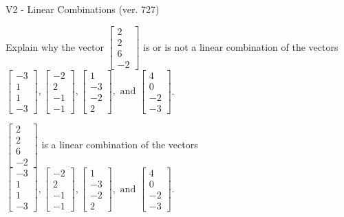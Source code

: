 \begin{exercise}
  \begin{exerciseTitle}V2 - Linear Combinations (ver. 727)\end{exerciseTitle}
  \begin{exerciseStatement}
    Explain why the vector \(\left[\begin{array}{c}
2 \\
2 \\
6 \\
-2
\end{array}\right]\)  is or is not a linear 
	combination of the vectors \(\left[\begin{array}{c}
-3 \\
1 \\
1 \\
-3
\end{array}\right] , \left[\begin{array}{c}
-2 \\
2 \\
-1 \\
-1
\end{array}\right] , \left[\begin{array}{c}
1 \\
-3 \\
-2 \\
2
\end{array}\right] , \text{ and } \left[\begin{array}{c}
4 \\
0 \\
-2 \\
-3
\end{array}\right]\).
	


  \end{exerciseStatement}
  \begin{exerciseAnswer}
   \(\left[\begin{array}{c}
2 \\
2 \\
6 \\
-2
\end{array}\right]\) 
  	 is  
	a linear combination of the vectors \(\left[\begin{array}{c}
-3 \\
1 \\
1 \\
-3
\end{array}\right] , \left[\begin{array}{c}
-2 \\
2 \\
-1 \\
-1
\end{array}\right] , \left[\begin{array}{c}
1 \\
-3 \\
-2 \\
2
\end{array}\right] , \text{ and } \left[\begin{array}{c}
4 \\
0 \\
-2 \\
-3
\end{array}\right]\).


\end{exerciseAnswer}
\end{exercise}
